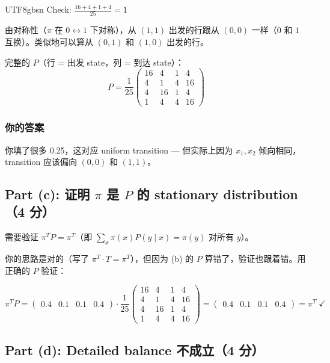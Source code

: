 \documentclass[11pt]{article}
\begin{document}
\begin{CJK}{UTF8}{gbsn}
Check: $\frac{16+4+1+4}{25} = 1$ \checkmark

由对称性（$\pi$ 在 $0 \leftrightarrow 1$ 下对称），从 $(1,1)$ 出发的行跟从 $(0,0)$ 一样（$0$ 和 $1$ 互换）。类似地可以算从 $(0,1)$ 和 $(1,0)$ 出发的行。

完整的 $P$（行 = 出发 state，列 = 到达 state）：
\[
  P = \frac{1}{25}\begin{pmatrix}
    16 & 4 & 1 & 4 \\
    4 & 1 & 4 & 16 \\
    4 & 16 & 1 & 4 \\
    1 & 4 & 4 & 16
  \end{pmatrix}
\]

\subsubsection{你的答案}

你填了很多 0.25，这对应 uniform transition --- 但实际上因为 $x_1, x_2$ 倾向相同，transition 应该偏向 $(0,0)$ 和 $(1,1)$。

\subsection{Part (c): 证明 $\pi$ 是 $P$ 的 stationary distribution（4 分）}

需要验证 $\pi^T P = \pi^T$（即 $\sum_x \pi(x) P(y \mid x) = \pi(y)$ 对所有 $y$）。

你的思路是对的（写了 $\pi^T \cdot T = \pi^T$），但因为 (b) 的 $P$ 算错了，验证也跟着错。用正确的 $P$ 验证：

\[
  \pi^T P = \begin{pmatrix} 0.4 & 0.1 & 0.1 & 0.4 \end{pmatrix}
  \cdot \frac{1}{25}\begin{pmatrix} 16 & 4 & 1 & 4 \\ 4 & 1 & 4 & 16 \\ 4 & 16 & 1 & 4 \\ 1 & 4 & 4 & 16 \end{pmatrix}
  = \begin{pmatrix} 0.4 & 0.1 & 0.1 & 0.4 \end{pmatrix} = \pi^T \;\checkmark
\]

\subsection{Part (d): Detailed balance 不成立（4 分）}


\end{CJK}
\end{document}
